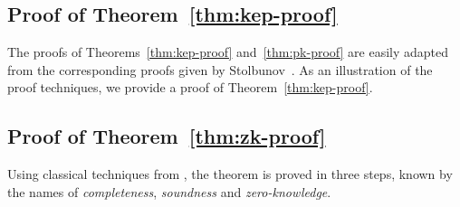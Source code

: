 \subsection{Proof of Theorem~\ref{thm:kep-proof}}\label{subsec:zkp-proof}

The proofs of Theorems~\ref{thm:kep-proof} and~\ref{thm:pk-proof} are
easily adapted from the corresponding proofs given by
Stolbunov~\cite{stolbunov-red}. As an illustration of the proof
techniques, we provide a proof of Theorem~\ref{thm:kep-proof}.



\subsection{Proof of Theorem~\ref{thm:zk-proof}}

Using classical techniques from
\cite{goldreich+micali+widgerson91,feige+fiat+shamir88}, the theorem
is proved in three steps, known by the names of \emph{completeness},
\emph{soundness} and \emph{zero-knowledge}.


